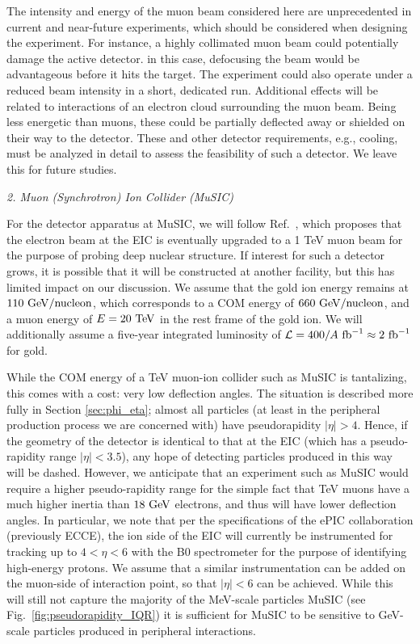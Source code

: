 The intensity and energy of the muon beam considered here are unprecedented in current and near-future experiments, which should be considered when designing the experiment. For instance, a highly collimated muon beam could potentially damage the active detector. in this case, defocusing the beam would be advantageous before it hits the target. The experiment could also operate under a reduced beam intensity in a short, dedicated run. Additional effects will be related to interactions of an electron cloud surrounding the muon beam. Being less energetic than muons, these could be partially deflected away or shielded on their way to the detector. These and other detector requirements, e.g., cooling, must be analyzed in detail to assess the feasibility of such a detector. We leave this for future studies. 

\begin{center}
    {\it 2. Muon (Synchrotron) Ion Collider (MuSIC)}
\end{center}

For the detector apparatus at MuSIC, we will follow Ref.~\cite{Acosta:2021qpx}, which proposes that the electron beam at the EIC is eventually upgraded to a 1 TeV muon beam for the purpose of probing deep nuclear structure. If interest for such a detector grows, it is possible that it will be constructed at another facility, but this has limited impact on our discussion. We assume that the gold ion energy remains at $110~{\rm GeV}/{\rm nucleon}$, which corresponds to a COM energy of $660~{\rm GeV}/{\rm nucleon}$, and a muon energy of $E = 20~{\rm TeV}$ in the rest frame of the gold ion. We will additionally assume a five-year integrated luminosity of ${\cal L} = 400/A~{\rm fb}^{-1} \approx 2~{\rm fb}^{-1}$ for gold. 

While the COM energy of a TeV muon-ion collider such as MuSIC is tantalizing, this comes with a cost: very low deflection angles. The situation is described more fully in  Section \ref{sec:phi_eta}; almost all particles (at least in the peripheral production process we are concerned with) have pseudorapidity $|\eta| > 4$. Hence, if the geometry of the detector is identical to that at the EIC (which has a pseudo-rapidity range $|\eta| < 3.5$), any hope of detecting particles produced in this way will be dashed. However, we anticipate that an experiment such as MuSIC would require a higher pseudo-rapidity range for the simple fact that TeV muons have a much higher inertia than $18~{\rm GeV}$ electrons, and thus will have lower deflection angles. In particular, we note that per the specifications of the ePIC collaboration (previously ECCE), the ion side of the EIC will currently be instrumented for tracking up to $4 < \eta < 6$ with the B0 spectrometer \cite{Adkins:2022jfp} for the purpose of identifying high-energy protons. We assume that a similar instrumentation can be added on the muon-side of interaction point, so that $|\eta| < 6$ can be achieved. While this will still not capture the majority of the MeV-scale particles MuSIC (see Fig.~\ref{fig:pseudorapidity_IQR}) it is sufficient for MuSIC to be sensitive to GeV-scale particles produced in peripheral interactions.



